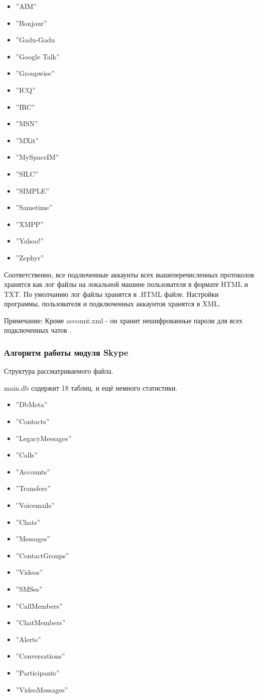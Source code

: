 \begin{itemize}
\item''AIM''
\item''Bonjour''
\item''Gadu-Gadu
\item''Google Talk''
\item''Groupwise''
\item''ICQ''
\item''IRC''
\item''MSN''
\item''MXit''
\item''MySpaceIM''
\item''SILC''
\item''SIMPLE''
\item''Sametime''
\item''XMPP''
\item''Yahoo!''
\item''Zephyr''
\end{itemize}

Соответственно, все подлюченные аккаунты всех вышеперечисленных протоколов хранятся как лог файлы на локальной машине пользователя в формате HTML и TXT. По умолчанию лог файлы хранятся в .HTML файле. Настройки программы, пользователя и подключенных аккаунтов хранятся в XML.

Примечание: Кроме account.xml - он хранит нешифрованные пароли для всех подключенных чатов \cite{ofpidgin}.

\subsubsection{Алгоритм работы модуля Skype}

Структура рассматриваемого файла.

main.db  содержит 18 таблиц. и ещё немного статистики.

\begin{itemize}
\item''DbMeta''   
\item''Contacts''   
\item''LegacyMessages''
\item''Calls''     
\item''Accounts''   
\item''Transfers''   
\item''Voicemails''   
\item''Chats''      
\item''Messages''   
\item''ContactGroups''  
\item''Videos''   
\item''SMSes''
\item''CallMembers''   
\item''ChatMembers''   
\item''Alerts''
\item''Conversations''     
\item''Participants''   
\item''VideoMessages''
\end{itemize}

